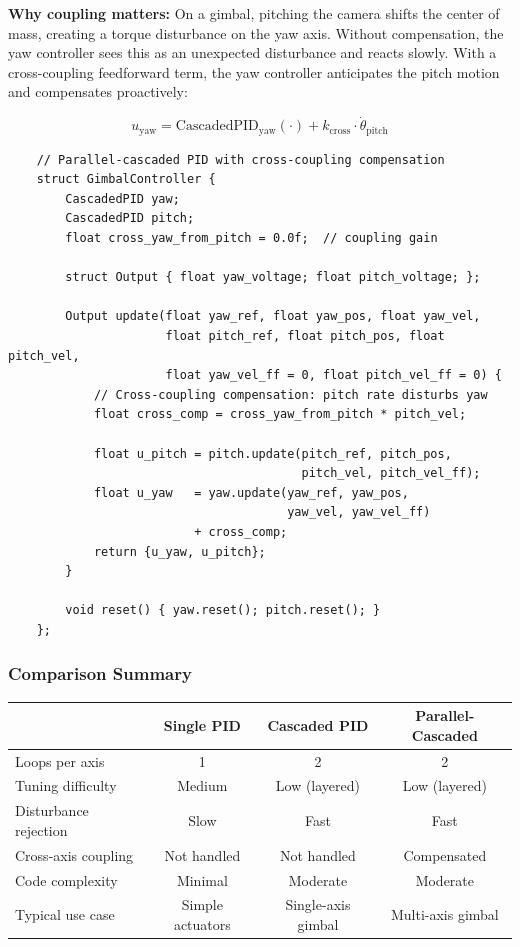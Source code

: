\textbf{Why coupling matters:} On a gimbal, pitching the camera shifts the center of mass, creating a torque disturbance on the yaw axis. Without compensation, the yaw controller sees this as an unexpected disturbance and reacts slowly. With a cross-coupling feedforward term, the yaw controller anticipates the pitch motion and compensates proactively:

\[
u_{\text{yaw}} = \text{CascadedPID}_{\text{yaw}}(\cdot) + k_{\text{cross}} \cdot \dot{\theta}_{\text{pitch}}
\]

\begin{verbatim}
    // Parallel-cascaded PID with cross-coupling compensation
    struct GimbalController {
        CascadedPID yaw;
        CascadedPID pitch;
        float cross_yaw_from_pitch = 0.0f;  // coupling gain

        struct Output { float yaw_voltage; float pitch_voltage; };

        Output update(float yaw_ref, float yaw_pos, float yaw_vel,
                      float pitch_ref, float pitch_pos, float pitch_vel,
                      float yaw_vel_ff = 0, float pitch_vel_ff = 0) {
            // Cross-coupling compensation: pitch rate disturbs yaw
            float cross_comp = cross_yaw_from_pitch * pitch_vel;

            float u_pitch = pitch.update(pitch_ref, pitch_pos,
                                         pitch_vel, pitch_vel_ff);
            float u_yaw   = yaw.update(yaw_ref, yaw_pos,
                                       yaw_vel, yaw_vel_ff)
                          + cross_comp;
            return {u_yaw, u_pitch};
        }

        void reset() { yaw.reset(); pitch.reset(); }
    };
\end{verbatim}

\subsubsection{Comparison Summary}

\begin{center}
\begin{tabular}{lccc}
\toprule
 & \textbf{Single PID} & \textbf{Cascaded PID} & \textbf{Parallel-Cascaded} \\
\midrule
Loops per axis & 1 & 2 & 2 \\
Tuning difficulty & Medium & Low (layered) & Low (layered) \\
Disturbance rejection & Slow & Fast & Fast \\
Cross-axis coupling & Not handled & Not handled & Compensated \\
Code complexity & Minimal & Moderate & Moderate \\
Typical use case & Simple actuators & Single-axis gimbal & Multi-axis gimbal \\
\bottomrule
\end{tabular}
\end{center}

